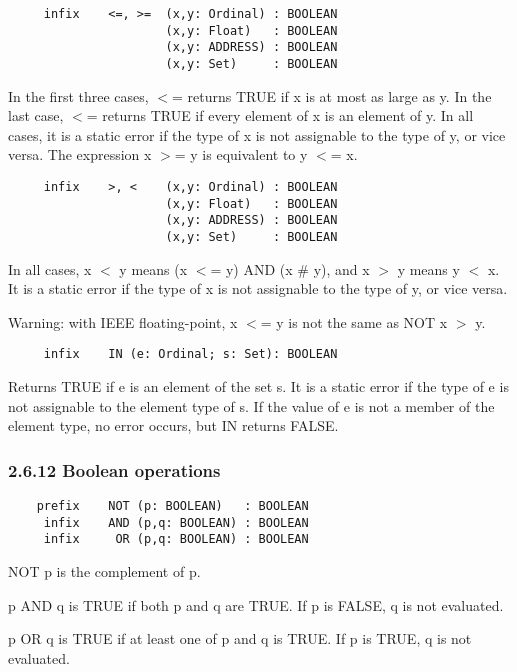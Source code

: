 \documentclass[10pt]{article}
\begin{document}
  
\begin{verbatim}
     infix    <=, >=  (x,y: Ordinal) : BOOLEAN
                      (x,y: Float)   : BOOLEAN
                      (x,y: ADDRESS) : BOOLEAN
                      (x,y: Set)     : BOOLEAN
\end{verbatim}
  In the first three cases, $<$= returns TRUE if x is at most as large as y. In the last case, $<$= returns TRUE if every element of x is an element of y. In all cases, it is a static error if the type of x is not assignable to the type of y, or vice versa. The expression x $>$= y is equivalent to y $<$= x. 


 
\begin{verbatim}
     infix    >, <    (x,y: Ordinal) : BOOLEAN
                      (x,y: Float)   : BOOLEAN
                      (x,y: ADDRESS) : BOOLEAN
                      (x,y: Set)     : BOOLEAN
\end{verbatim}
 In all cases, x $<$ y means (x $<$= y) AND (x \# y), and x $>$ y means y $<$ x. It is a static error if the type of x is not assignable to the type of y, or vice versa. 


  Warning: with IEEE floating-point, x $<$= y is not the same as NOT x $>$ y. 


  
\begin{verbatim}
     infix    IN (e: Ordinal; s: Set): BOOLEAN
\end{verbatim}
  Returns TRUE if e is an element of the set s. It is a static error if the type of e is not assignable to the element type of s. If the value of e is not a member of the element type, no error occurs, but IN returns FALSE. 


 
\subsubsection*{2.6.12 Boolean operations}


 
\begin{verbatim}
    prefix    NOT (p: BOOLEAN)   : BOOLEAN 
     infix    AND (p,q: BOOLEAN) : BOOLEAN 
     infix     OR (p,q: BOOLEAN) : BOOLEAN
\end{verbatim}
 NOT p is the complement of p. 


 p AND q is TRUE if both p and q are TRUE. If p is FALSE, q is not evaluated. 


 p OR q is TRUE if at least one of p and q is TRUE. If p is TRUE, q is not evaluated. 
\end{document}
